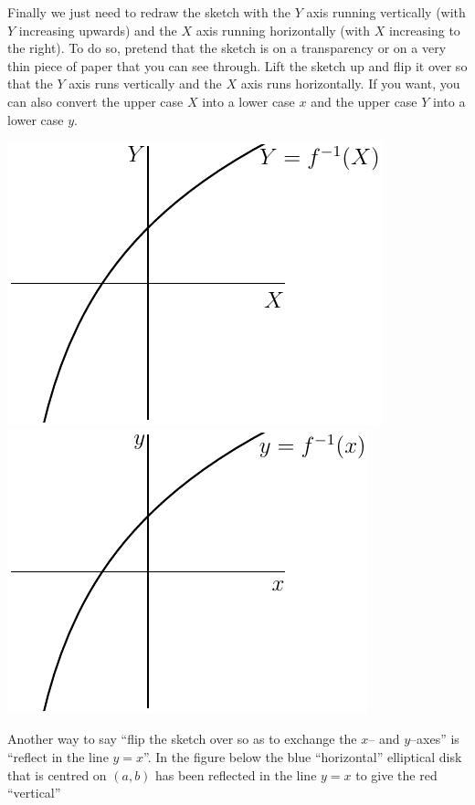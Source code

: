 Finally we just need to redraw the sketch with the $Y$ axis running vertically
(with $Y$ increasing upwards) and the $X$ axis running horizontally (with
$X$ increasing to the right). To do so, pretend that the sketch is on
a transparency or on a very thin piece of paper that you can see through.
Lift the sketch up and flip it over so that the $Y$ axis runs vertically
and the $X$ axis runs horizontally. If you want, you can also convert the upper
case $X$ into a lower case $x$ and the upper case $Y$ into a lower case
$y$.
\begin{wfig}
\begin{center}
   \includegraphics{fInvC}\qquad   \includegraphics{fInvD}
\end{center}
\end{wfig}
Another way to say ``flip the sketch over so as to exchange the
$x$-- and $y$--axes'' is ``reflect in the line $y=x$''. In the
figure below the blue ``horizontal'' elliptical disk that is centred
on $(a,b)$ has been reflected in the line $y=x$ to give the red ``vertical''
